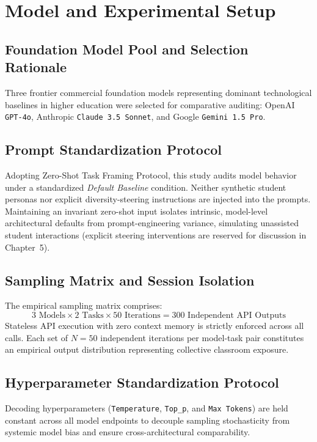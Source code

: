 \section{Model and Experimental Setup}

\subsection{Foundation Model Pool and Selection Rationale}
Three frontier commercial foundation models representing dominant technological baselines in higher education were selected for comparative auditing: OpenAI \texttt{GPT-4o}, Anthropic \texttt{Claude 3.5 Sonnet}, and Google \texttt{Gemini 1.5 Pro}.

\subsection{Prompt Standardization Protocol}
Adopting \cite{Sahoo2024} Zero-Shot Task Framing Protocol, this study audits model behavior under a standardized \textit{Default Baseline} condition. Neither synthetic student personas nor explicit diversity-steering instructions are injected into the prompts. Maintaining an invariant zero-shot input isolates intrinsic, model-level architectural defaults from prompt-engineering variance, simulating unassisted student interactions (explicit steering interventions are reserved for discussion in Chapter~5).

\subsection{Sampling Matrix and Session Isolation}
The empirical sampling matrix comprises:
\begin{equation}
3 \text{ Models} \times 2 \text{ Tasks} \times 50 \text{ Iterations} = 300 \text{ Independent API Outputs}
\end{equation}
Stateless API execution with zero context memory is strictly enforced across all calls. Each set of $N = 50$ independent iterations per model-task pair constitutes an empirical output distribution representing collective classroom exposure.

\subsection{Hyperparameter Standardization Protocol}
Decoding hyperparameters (\texttt{Temperature}, \texttt{Top\_p}, and \texttt{Max Tokens}) are held constant across all model endpoints to decouple sampling stochasticity from systemic model bias and ensure cross-architectural comparability.

